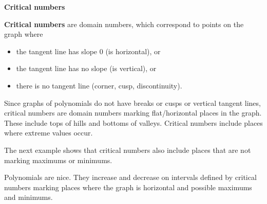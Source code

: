 \documentclass{ximera}
\begin{document}
\begin{idea} \item \textbf{\textcolor{blue!55!black}{Critical numbers}}

\textbf{Critical numbers} are domain numbers, which correspond to points on the graph where 

\begin{itemize}
\item the tangent line has slope $0$ (is horizontal), or 
\item the tangent line has no slope (is vertical), or
\item there is no tangent line (corner, cusp, discontinuity).
\end{itemize}


\end{idea}




Since graphs of polynomials do not have breaks or cusps or vertical tangent lines, critical numbers are domain numbers marking flat/horizontal places in the graph.  These include tops of hills and bottoms of valleys. Critical numbers include places where extreme values occur.


The next example shows that critical numbers also include places that are not marking maximums or minimums.


















Polynomials are nice.  They increase and decrease on intervals defined by critical numbers marking places where the graph is horizontal and possible maximums and minimums.
\end{document}
